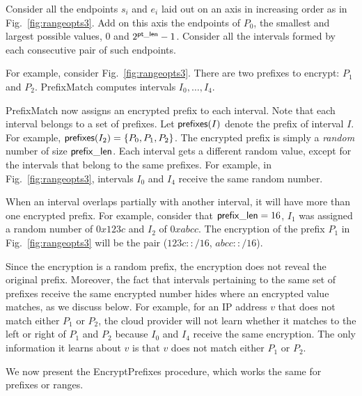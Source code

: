 Consider all the endpoints $s_i$ and $e_i$ laid out on an axis in increasing order as in Fig.~\ref{fig:rangeopts3}.
Add on this axis the endpoints of $P_0$, the smallest and largest possible values, $0$ and $2^{\mathsf{pt\_len}}-1$.
Consider all the intervals formed by each consecutive pair of such endpoints. 

For example, consider Fig.~\ref{fig:rangeopts3}.  There are two prefixes to encrypt: $P_1$ and $P_2$. PrefixMatch computes intervals $I_0, \dots, I_4$.

PrefixMatch now assigns an encrypted prefix to each interval. Note that each interval belongs to a set of prefixes. Let $\mathsf{prefixes}(I)$ denote the prefix of interval $I$. For example, $\mathsf{prefixes}(I_2) = \{P_0, P_1, P_2\}$. The encrypted prefix is simply a {\em random} number of size $\mathsf{prefix\_len}$. Each interval gets a different random value, except for the intervals that belong to the same prefixes. For example, in Fig.~\ref{fig:rangeopts3}, intervals $I_0$ and $I_4$ receive the same random number.

When an interval overlaps partially with another interval, it will have more than one encrypted prefix. For example, consider that $\mathsf{prefix\_len} = 16$, $I_1$ was assigned a random number of $0x123c$ and $I_2$ of $0xabcc$. The encryption of the prefix $P_1$ in Fig.~\ref{fig:rangeopts3} will be the pair ($123c::/16$, $abcc::/16$).

Since the encryption is a random prefix, the encryption does not reveal the original prefix. Moreover, the fact that intervals pertaining to the same set of prefixes receive the same encrypted number hides where an encrypted value matches, as we discuss below. For example, for an IP address $v$ that does not match either $P_1$ or $P_2$, the cloud provider will not learn whether it matches to the left or right of $P_1$ and $P_2$ because $I_0$ and $I_4$ receive the same encryption. The only information it learns about $v$ is that $v$ does not match either $P_1$ or $P_2$. 

We now present the EncryptPrefixes procedure, which works the same for prefixes or ranges.



